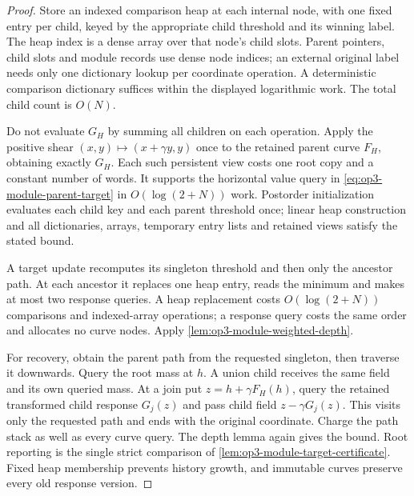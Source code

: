 \begin{proof}
Store an indexed comparison heap at each internal node, with one fixed
entry per child, keyed by the appropriate child threshold and its winning
label. The heap index is a dense array over that node's child slots.
Parent pointers, child slots and module records use dense node indices;
an external original label needs only one dictionary lookup per coordinate
operation. A deterministic comparison dictionary suffices within the
displayed logarithmic work. The total child count is $O(N)$.

Do not evaluate $G_H$ by summing all children on each operation. Apply the
positive shear $(x,y)\mapsto(x+\gamma y,y)$ once to the retained parent
curve $F_H$, obtaining exactly $G_H$. Each such persistent view costs one
root copy and a constant number of words. It supports the horizontal
value query in \cref{eq:op3-module-parent-target} in $O(\log(2+N))$ work.
Postorder initialization evaluates each child key and each parent
threshold once; linear heap construction and all dictionaries, arrays,
temporary entry lists and retained views satisfy the stated bound.

A target update recomputes its singleton threshold and then only the
ancestor path. At each ancestor it replaces one heap entry, reads the
minimum and makes at most two response queries. A heap replacement costs
$O(\log(2+N))$ comparisons and indexed-array operations; a response query
costs the same order and allocates no curve nodes. Apply
\cref{lem:op3-module-weighted-depth}.

For recovery, obtain the parent path from the requested singleton, then
traverse it downwards. Query the root mass at $h$. A union child receives
the same field and its own queried mass. At a join put
$z=h+\gamma F_H(h)$, query the retained transformed child response
$G_j(z)$ and pass child field $z-\gamma G_j(z)$. This visits only the
requested path and ends with the original coordinate. Charge the path
stack as well as every curve query. The depth lemma again gives the bound.
Root reporting is the single strict comparison of
\cref{lem:op3-module-target-certificate}. Fixed heap membership prevents
history growth, and immutable curves preserve every old response version.
\end{proof}

